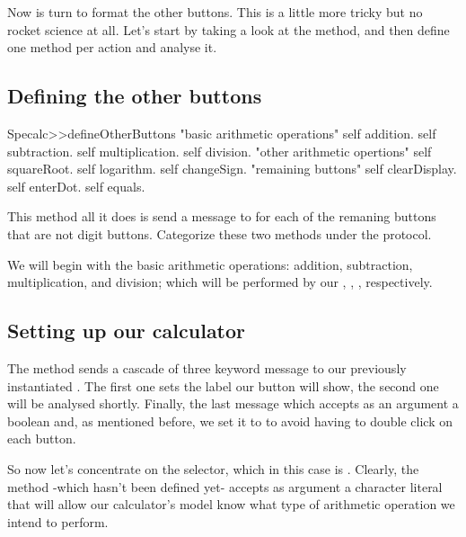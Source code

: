 \documentclass[a4paper,10pt,twoside]{book}
\begin{document}
Now is turn to format the other buttons. This is a little more tricky but no rocket science at all. Let's start by taking a look at the method, and then define one method per action and analyse it.
\subsection{ Defining the other buttons}

\begin{code}{}
Specalc>>defineOtherButtons
	"basic arithmetic operations"
	self addition.
	self subtraction.
	self multiplication.
	self division.
	"other arithmetic opertions"
	self squareRoot.
	self logarithm.
	self changeSign.
	"remaining buttons"
	self clearDisplay.
	self enterDot.
	self equals.
\end{code}


This method all it does is send a message to  for each of the remaning buttons that are not digit buttons. Categorize these two methods under the  protocol.

We will begin with the basic arithmetic operations: addition, subtraction, multiplication, and division; which will be performed by our , , ,  respectively.
\subsection{ Setting up our calculator}


The method sends a cascade of three keyword message to our previously instantiated . The first one  sets the label our button will show, the second one  will be analysed shortly.
Finally, the last message  which accepts as an argument a boolean and, as mentioned before, we set it to  to avoid having to double click on each button.

So now let's concentrate on the  selector, which in this case is .
Clearly, the  method -which hasn't been defined yet- accepts as argument a character literal \ct{\$\_} that will allow our calculator's model know what type of arithmetic operation we intend to perform.
\end{document}
